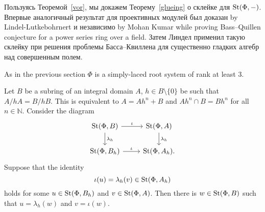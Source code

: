 \documentclass[oneside, 11pt]{amsart} \pdfoutput=1
\begin{document}
Пользуясь Теоремой~\ref{vor}, мы докажем Теорему~\ref{glueing} о склейке для $\mathop{\mathrm{St}}\nolimits(\Phi,-)$. Впервые аналогичный результат для проективных модулей был доказан by Lindel-Lutkebohrnert и независимо by Mohan Kumar while proving Bass--Quillen conjecture for a power series ring over a field. Затем Линдел применил такую склейку при решения проблемы Басса--Квиллена для существенно гладких алгебр над совершенным полем.

As in the previous section $\Phi$ is a simply-laced root system of rank at least $3$.

\begin{theorem}\label{glueing}
Let $B$ be a subring of an integral domain $A$, $h\in B \setminus \{0\}$ be such that $A / hA = B / hB$. This is equivalent to $A = Ah^n + B$ and $Ah^n \cap B = Bh^n$ for all $n \in \mathbb N$. Consider the diagram
$$\begin{tikzcd}
\St(\Phi, B) \ar{r}{\iota} \ar{d}{\lambda_h} & \St(\Phi, A) \ar{d}{\lambda_h}\\
\St(\Phi, B_h) \ar{r}{\iota} & \St(\Phi, A_h).
\end{tikzcd}$$
Suppose that the identity
$$\iota(u) = \lambda_h(v) \in \mathop{\mathrm{St}}\nolimits(\Phi, A_h)$$
holds for some $u \in \mathop{\mathrm{St}}\nolimits(\Phi, B_h)$ and $v \in \mathop{\mathrm{St}}\nolimits(\Phi, A)$. Then there is $w \in \mathop{\mathrm{St}}\nolimits(\Phi, B)$ such that $u = \lambda_h(w)$ and $v = \iota(w)$.
\end{theorem}
\end{document}
